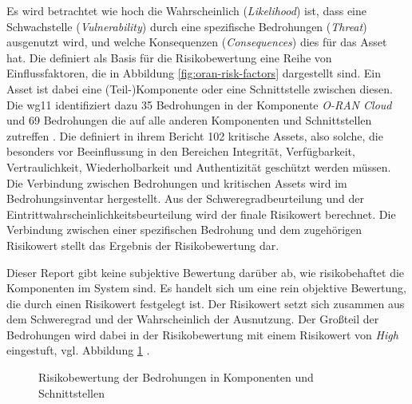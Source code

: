 \par Es wird betrachtet wie hoch die Wahrscheinlich (\textit{Likelihood}) ist, dass eine Schwachstelle (\textit{Vulnerability}) durch eine spezifische Bedrohungen (\textit{Threat}) ausgenutzt wird, und welche Konsequenzen (\textit{Consequences}) dies für das Asset hat. Die \orana definiert als Basis für die Risikobewertung eine Reihe von Einflussfaktoren, die in Abbildung \ref{fig:oran-risk-factors} dargestellt sind. Ein Asset ist dabei eine (Teil-)Komponente oder eine Schnittstelle zwischen diesen.  Die \gls{wg11} identifiziert dazu 35 Bedrohungen in der Komponente \textit{O-RAN Cloud} und 69 Bedrohungen die auf alle anderen Komponenten und Schnittstellen zutreffen \autocite[Seite 31 - 69]{o-ranworkgroup11securityworkgroupORANSecurityThreat2024}. Die \orana definiert in ihrem Bericht 102 kritische Assets, also solche, die besonders vor Beeinflussung in den Bereichen Integrität, Verfügbarkeit, Vertraulichkeit, Wiederholbarkeit und Authentizität geschützt werden müssen. Die Verbindung zwischen Bedrohungen und kritischen Assets wird im Bedrohungsinventar hergestellt. Aus der Schweregradbeurteilung und der Eintrittwahrscheinlichkeitsbeurteilung wird der finale Risikowert berechnet. Die Verbindung zwischen einer spezifischen Bedrohung und dem zugehörigen Risikowert stellt das Ergebnis der Risikobewertung dar.
\par Dieser Report gibt keine subjektive Bewertung darüber ab, wie risikobehaftet die Komponenten im System sind. Es handelt sich um eine rein objektive Bewertung, die durch einen Risikowert festgelegt ist. Der Risikowert setzt sich zusammen aus dem Schweregrad und der Wahrscheinlich der Ausnutzung. Der Großteil der Bedrohungen wird dabei in der Risikobewertung mit einem Risikowert von \textit{High} eingestuft, vgl. Abbildung \ref{fig:riskscore-oran-components} \autocite[Seite 130 - 164]{o-ranworkgroup11securityworkgroupORANSecurityThreat2024}.
%
\begin{figure}
    \centering
    \label{fig:riskscore-oran-components}
    \caption{Risikobewertung der Bedrohungen in \oran Komponenten und Schnittstellen}
\end{figure}
%

